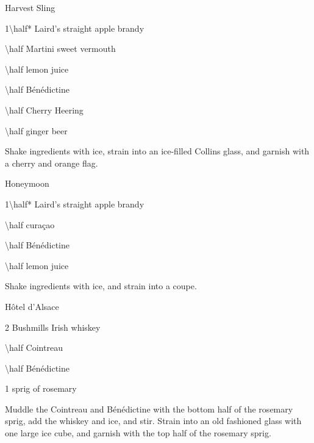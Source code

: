 \begin{Cocktail}[\PDT]{Harvest Sling}
  \begin{Ingredients}
  \item \SI{1\half*}{\oz} Laird's straight apple brandy
  \item \SI{\half}{\oz} Martini sweet vermouth
  \item \SI{\half}{\oz} lemon juice
  \item \SI{\half}{\oz} B\'en\'edictine
  \item \SI{\half}{\oz} Cherry Heering
  \item \SI{\half}{\oz} ginger beer
  \end{Ingredients}
  
  \begin{Instructions}
	Shake ingredients with ice, strain into an ice-filled Collins glass, and garnish with a cherry and orange flag.
  \end{Instructions}
\end{Cocktail}

\begin{Cocktail}[\PDT*]{Honeymoon}
  \begin{Ingredients}
  \item \SI{1\half*}{\oz} Laird's straight apple brandy
  \item \SI{\half}{\oz} cura\c cao
  \item \SI{\half}{\oz} B\'en\'edictine
  \item \SI{\half}{\oz} lemon juice
  \end{Ingredients}
  
  \begin{Instructions}
	Shake ingredients with ice, and strain into a coupe.
  \end{Instructions}
\end{Cocktail}

\begin{Cocktail}[\PDT]{H\^otel d'Alsace}
  \begin{Ingredients}
  \item \SI{2}{\oz} Bushmills Irish whiskey
  \item \SI{\half}{\oz} Cointreau
  \item \SI{\half}{\oz} B\'en\'edictine
  \item 1 sprig of rosemary
  \end{Ingredients}
  
  \begin{Instructions}
	Muddle the Cointreau and B\'en\'edictine with the bottom half of the rosemary sprig, add the whiskey and ice, and stir.  Strain into an old fashioned glass with one large ice cube, and garnish with the top half of the rosemary sprig.
  \end{Instructions}
\end{Cocktail}

